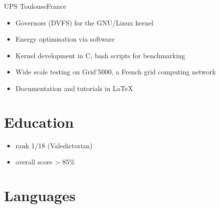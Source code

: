 \documentclass[a4paper,11pt]{moderncv}
\begin{document}
{UPS Toulouse}{France}
{
    \begin{itemize}
        \item Governors (DVFS) for the GNU/Linux kernel
        \item Energy optimisation via software
        \item Kernel development in C, bash scripts for benchmarking
        \item Wide scale testing on Grid'5000, a French grid computing network
        \item Documentation and tutorials in \LaTeX
    \end{itemize}
}


\section{Education}
{
  \begin{itemize}
  \item rank 1/18 (Valedictorian)
  \item overall score > 85\%
  \end{itemize}
}


\section{Languages}
\end{document}
